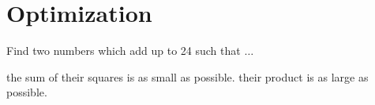 \section*{Optimization} \label{sec:factorial}
\begin{exercise}
	Find two numbers which add up to 24 such that $\ldots$
	\begin{tasks}
		\task the sum of their squares is as small as possible.
		\task their product is as large as possible.
	\end{tasks}
\end{exercise}

